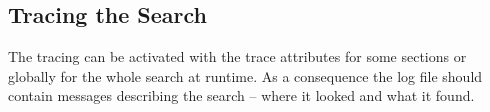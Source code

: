 \begin{lstlisting}[language=XML]
\end{lstlisting}

\subsection{Tracing the Search}

The tracing can be activated with the trace attributes for some
sections or globally for the whole search at runtime. As a consequence
the log file should contain messages describing the search -- where it
looked and what it found.

\INCOMPLETE

\begin{lstlisting}[language=XML]
\end{lstlisting}

\endinput
%
